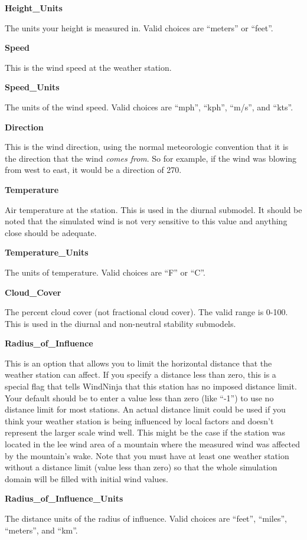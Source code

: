 \documentclass[12pt]{article}
\begin{document}
\textbf{Height\_Units}

The units your height is measured in.  Valid choices are “meters” or “feet”.

\textbf{Speed}

This is the wind speed at the weather station.

\textbf{Speed\_Units}

The units of the wind speed.  Valid choices are “mph”, “kph”, “m/s”, and “kts”.

\textbf{Direction}

This is the wind direction, using the normal meteorologic convention that it is the direction that the wind \textit{comes from}.  So for example, if the wind was blowing from west to east, it would be a direction of 270.

\textbf{Temperature}

Air temperature at the station.  This is used in the diurnal submodel.  It should be noted that the simulated wind is not very sensitive to this value and anything close should be adequate.

\textbf{Temperature\_Units}

The units of temperature.  Valid choices are “F” or “C”.

\textbf{Cloud\_Cover}

The percent cloud cover (not fractional cloud cover).  The valid range is 0-100.  This is used in the diurnal and non-neutral stability submodels.

\textbf{Radius\_of\_Influence}

This is an option that allows you to limit the horizontal distance that the weather station can affect.  If you specify a distance less than zero, this is a special flag that tells WindNinja that this station has no imposed distance limit.  Your default should be to enter a value less than zero (like “-1”) to use no distance limit for most stations.  An actual distance limit could be used if you think your weather station is being influenced by local factors and doesn't represent the larger scale wind well.  This might be the case if the station was located in the lee wind area of a mountain where the measured wind was affected by the mountain's wake.  Note that you must have at least one weather station without a distance limit (value less than zero) so that the whole simulation domain will be filled with initial wind values.

\textbf{Radius\_of\_Influence\_Units}

The distance units of the radius of influence.  Valid choices are “feet”, “miles”, “meters”, and “km”.
\end{document}
